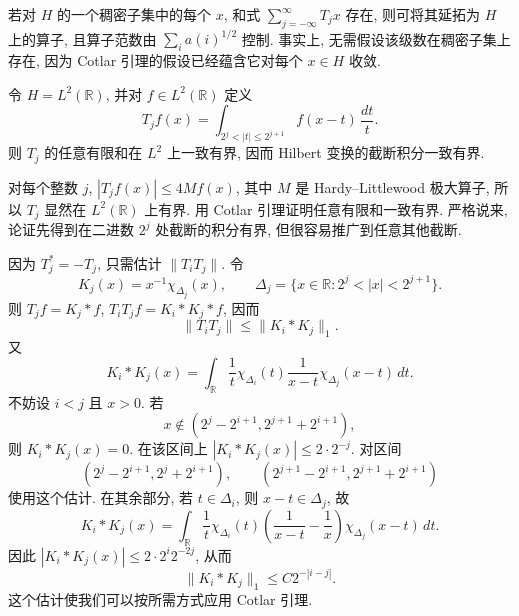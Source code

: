 若对 $H$ 的一个稠密子集中的每个 $x$, 和式 $\sum_{j=-\infty}^{\infty}T_jx$ 存在, 则可将其延拓为 $H$ 上的算子, 且算子范数由 $\sum_i a(i)^{1/2}$ 控制. 事实上, 无需假设该级数在稠密子集上存在, 因为 Cotlar 引理的假设已经蕴含它对每个 $x\in H$ 收敛.

\hypertarget{chapter-09-page-209}{}
\begin{Example}
\label{ex:ch9-cotlar-hilbert-transform}
令 $H=L^2(\mathbb R)$, 并对 $f\in L^2(\mathbb R)$ 定义
\[
 T_jf(x)=\int_{2^j<|t|\le2^{j+1}}f(x-t)\,\frac{dt}{t}.
\]
则 $T_j$ 的任意有限和在 $L^2$ 上一致有界, 因而 Hilbert 变换的截断积分一致有界.
\end{Example}

对每个整数 $j$, $|T_jf(x)|\le4Mf(x)$, 其中 $M$ 是 Hardy--Littlewood 极大算子, 所以 $T_j$ 显然在 $L^2(\mathbb R)$ 上有界. 用 Cotlar 引理证明任意有限和一致有界. 严格说来, 论证先得到在二进数 $2^j$ 处截断的积分有界, 但很容易推广到任意其他截断.

因为 $T_j^*=-T_j$, 只需估计 $\|T_iT_j\|$. 令
\[
 K_j(x)=x^{-1}\chi_{\Delta_j}(x),
 \qquad
 \Delta_j=\{x\in\mathbb R:2^j<|x|<2^{j+1}\}.
\]
则 $T_jf=K_j*f$, $T_iT_jf=K_i*K_j*f$, 因而
\[
 \|T_iT_j\|\le\|K_i*K_j\|_1.
\]
又
\[
 K_i*K_j(x)=\int_{\mathbb R}\frac1t\chi_{\Delta_i}(t)
 \frac1{x-t}\chi_{\Delta_j}(x-t)\,dt.
\]
不妨设 $i<j$ 且 $x>0$. 若
\[
 x\notin(2^j-2^{i+1},2^{j+1}+2^{i+1}),
\]
则 $K_i*K_j(x)=0$. 在该区间上 $|K_i*K_j(x)|\le2\cdot2^{-j}$. 对区间
\[
 (2^j-2^{i+1},2^j+2^{i+1}),
 \qquad
 (2^{j+1}-2^{i+1},2^{j+1}+2^{i+1})
\]
使用这个估计. 在其余部分, 若 $t\in\Delta_i$, 则 $x-t\in\Delta_j$, 故
\[
 K_i*K_j(x)=\int_{\mathbb R}\frac1t\chi_{\Delta_i}(t)
 \left(\frac1{x-t}-\frac1x\right)\chi_{\Delta_j}(x-t)\,dt.
\]
因此 $|K_i*K_j(x)|\le2\cdot2^i2^{-2j}$, 从而
\[
 \|K_i*K_j\|_1\le C2^{-|i-j|}.
\]
这个估计使我们可以按所需方式应用 Cotlar 引理.
